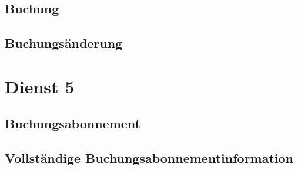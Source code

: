 \subsection*{Buchung}
\label{subsec:Nachrichten:Dienst4:Booking}



\medskip




\subsection*{Buchungsänderung}
\label{subsec:Nachrichten:Dienst4:ChangeBooking}





\section{Dienst 5}
\label{sec:Nachrichten:Dienst5}

\subsection*{Buchungsabonnement}
\label{subsec:Nachrichten:Dienst5:BookingAlertSubscription}





% 

% 



\subsection*{Vollständige Buchungsabonnementinformation}
\label{subsec:Nachrichten:Dienst5:CompleteBookingAlert}





